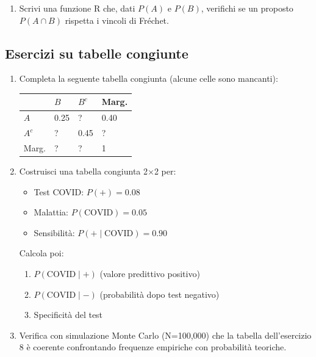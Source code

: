 \documentclass[
  italian,
  letterpaper,
  a4paper,
  11pt,
  open=any]{scrbook}
\newcounter{none} %
\providecommand{\tightlist}{%
  \setlength{\itemsep}{0pt}\setlength{\parskip}{0pt}}
\theoremstyle{plain}
\theoremstyle{definition}
\theoremstyle{definition}
\theoremstyle{remark}
\begin{document}
\begin{tcolorbox}
\begin{enumerate}
  \begin{itemize}
  \tightlist
  \item
    \(P(\text{Depressione}) = 0.30\)
  \item
    \(P(\text{Insonnia}) = 0.45\)
  \end{itemize}

  Determina l'intervallo di valori plausibili per
  \(P(\text{Depressione} \cap \text{Insonnia})\).
\item
  Scrivi una funzione R che, dati \(P(A)\) e \(P(B)\), verifichi se un
  proposto \(P(A \cap B)\) rispetta i vincoli di Fréchet.
\end{enumerate}

\subsection{Esercizi su tabelle
congiunte}\label{esercizi-su-tabelle-congiunte}

\begin{enumerate}
\def\labelenumi{\arabic{enumi}.}
\setcounter{enumi}{6}
\item
  Completa la seguente tabella congiunta (alcune celle sono mancanti):

  {\def\LTcaptype{none} %
  \begin{longtable}[]{@{}llll@{}}
  \toprule\noalign{}
  & \(B\) & \(B^c\) & Marg. \\
  \midrule\noalign{}
  \endhead
  \bottomrule\noalign{}
  \endlastfoot
  \(A\) & 0.25 & ? & 0.40 \\
  \(A^c\) & ? & 0.45 & ? \\
  Marg. & ? & ? & 1 \\
  \end{longtable}
  }
\item
  Costruisci una tabella congiunta 2×2 per:

  \begin{itemize}
  \tightlist
  \item
    Test COVID: \(P(+) = 0.08\)
  \item
    Malattia: \(P(\text{COVID}) = 0.05\)
  \item
    Sensibilità: \(P(+ \mid \text{COVID}) = 0.90\)
  \end{itemize}

  Calcola poi:

  \begin{enumerate}
  \def\labelenumii{\alph{enumii}.}
  \tightlist
  \item
    \(P(\text{COVID} \mid +)\) (valore predittivo positivo)
  \item
    \(P(\text{COVID} \mid -)\) (probabilità dopo test negativo)
  \item
    Specificità del test
  \end{enumerate}
\item
  Verifica con simulazione Monte Carlo (N=100,000) che la tabella
  dell'esercizio 8 è coerente confrontando frequenze empiriche con
  probabilità teoriche.
\end{enumerate}


\end{tcolorbox}
\end{document}
